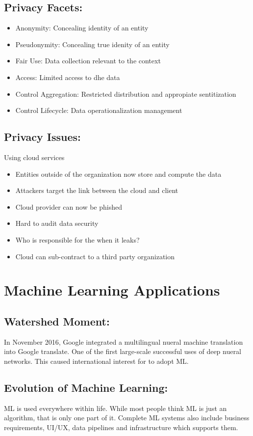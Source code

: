 \documentclass[a5paper]{article}
\begin{document}
	\subsection{Privacy Facets:}
	\begin{itemize}
		\item Anonymity: Concealing identity of an entity
		\item Pseudonymity: Concealing true idenity of an entity
		\item Fair Use: Data collection relevant to the context
		\item Access: Limited access to dhe data
		\item Control Aggregation: Restricted distribution and appropiate sentitization
		\item Control Lifecycle: Data operationalization management
	\end{itemize}
	\subsection{Privacy Issues:}
	Using cloud services
	\begin{itemize}
		\item Entities outside of the organization now store and compute the data
		\item Attackers target the link between the cloud and client
		\item Cloud provider can now be phished
		\item Hard to audit data security
		\item Who is responsible for the when it leaks?
		\item Cloud can sub-contract to a third party organization
	\end{itemize}

	\section{Machine Learning Applications}
	\subsection{Watershed Moment:}
	In November 2016, Google integrated a multilingual nueral machine translation into Google translate. One of the first large-scale successful uses of deep nueral networks. This caused international interest for to adopt ML.
	\subsection{Evolution of Machine Learning:}
	ML is used everywhere within life. While most people think ML is just an algorithm, that is only one part of it. Complete ML systems also include business requirements, UI/UX, data pipelines and infrastructure which supports them.
\end{document}
